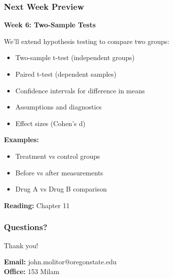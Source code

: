 \documentclass{beamer}
\begin{document}
\begin{frame}
\frametitle{Next Week Preview}
\textbf{Week 6: Two-Sample Tests}

\vspace{0.5cm}
We'll extend hypothesis testing to compare two groups:
\begin{itemize}
\item Two-sample t-test (independent groups)
\item Paired t-test (dependent samples)
\item Confidence intervals for difference in means
\item Assumptions and diagnostics
\item Effect sizes (Cohen's d)
\end{itemize}

\vspace{0.5cm}
\textbf{Examples:}
\begin{itemize}
\item Treatment vs control groups
\item Before vs after measurements
\item Drug A vs Drug B comparison
\end{itemize}

\vspace{0.5cm}
\textbf{Reading:} Chapter 11
\end{frame}

\begin{frame}
\frametitle{Questions?}
\begin{center}
\Large{Thank you!}

\vspace{1cm}

\textbf{Email:} john.molitor@oregonstate.edu\\
\textbf{Office:} 153 Milam
\end{center}
\end{frame}
\end{document}
